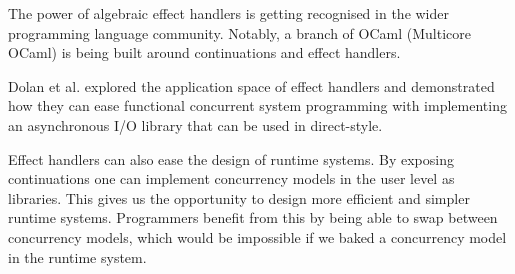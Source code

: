 \documentclass[class=article,crop=false,11pt]{standalone}
\begin{document}
The power of algebraic effect handlers is getting recognised in the wider programming language community. 
Notably, a branch of OCaml (Multicore OCaml) is being built around
continuations and effect handlers.

Dolan et al. \cite{dolan2017concurrent} explored the application space of effect handlers and 
demonstrated how they can ease functional concurrent system programming with implementing an asynchronous I/O 
library that can be used in direct-style.

Effect handlers can also ease the design of runtime systems. By exposing continuations one
can implement concurrency models in the user level as libraries. This gives us the opportunity
to design more efficient and simpler runtime systems. Programmers benefit from this by
being able to swap between concurrency models, which would be impossible if we baked a
concurrency model in the runtime system.






\ifstandalone
{}

\fi
\end{document}
